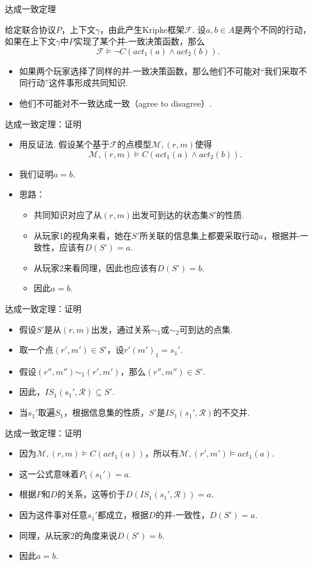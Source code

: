 {达成一致定理}
\begin{theorem}
给定联合协议$P$，上下文$\gamma$，由此产生Kripke框架$\mathcal F$. 设$a,b\in A$是两个不同的行动，如果在上下文$\gamma$中$P$实现了某个并-一致决策函数，那么
\[\mathcal F\vDash\neg C(act_1(a)\wedge act_2(b)).\]
\end{theorem}
\begin{itemize}
    \item 如果两个玩家选择了同样的并-一致决策函数，那么他们不可能对“我们采取不同行动”这件事形成共同知识.
    \item 他们不可能对不一致达成一致（agree to disagree）.
\end{itemize}


{达成一致定理：证明}
\begin{itemize}
    \item 用反证法. 假设某个基于$\mathcal F$的点模型$\mathcal M,(r,m)$使得
    \[\mathcal M,(r,m)\vDash C(act_1(a)\wedge act_2(b)).\]
    \item 我们证明$a=b$.
    \item 思路：
    \begin{itemize}
        \item 共同知识对应了从$(r,m)$出发可到达的状态集$S'$的性质.
        \item 从玩家1的视角来看，她在$S'$所关联的信息集上都要采取行动$a$，根据并-一致性，应该有$D(S')=a$.
        \item 从玩家2来看同理，因此也应该有$D(S')=b$.
        \item 因此$a=b$.
    \end{itemize}
\end{itemize}


{达成一致定理：证明}
\begin{itemize}
    \item 假设$S'$是从$(r,m)$出发，通过关系$\sim_1$或$\sim_2$可到达的点集.
    \item 取一个点$(r',m')\in S'$，设$r'(m')_1=s_1'$.
    \item 假设$(r'',m'')\sim_1(r',m')$，那么$(r'',m'')\in S'$.
    \item 因此，$IS_1(s_1',\mathcal R)\subseteq S'$.
    \item 当$s_1'$取遍$S_1$，根据信息集的性质，$S'$是$IS_1(s_1',\mathcal R)$的不交并.
\end{itemize}


{达成一致定理：证明}
\begin{itemize}
    \item 因为$\mathcal M,(r,m)\vDash C(act_1(a))$，所以有$\mathcal M,(r',m')\vDash act_1(a)$.
    \item 这一公式意味着$P_1(s_1')=a$.
    \item 根据$P$和$D$的关系，这等价于$D(IS_1(s_1',\mathcal R))=a$.
    \item 因为这件事对任意$s_1'$都成立，根据$D$的并-一致性，$D(S')=a$.
    \item 同理，从玩家2的角度来说$D(S')=b$.
    \item 因此$a=b$.
\end{itemize}


